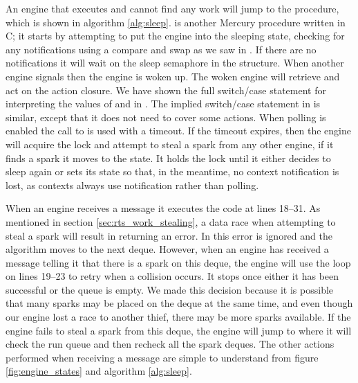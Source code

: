 An engine that executes \idle and cannot find any work will jump to the
\sleep procedure,
which is shown in algorithm \ref{alg:sleep}.
\sleep is another Mercury procedure written in C;
it starts by attempting to put the engine into the sleeping state,
checking for any notifications using a compare and swap as we saw in \idle.
If there are no notifications it will wait on the sleep semaphore in the
\enginesleepsync structure.
When another engine signals  then the engine is woken up.
The woken engine will retrieve and act on the action closure.
We have shown the full switch/case statement for interpreting the values of
 and  in \sleep.
The implied switch/case statement in \idle is similar,
except that it does not need to cover some actions.
When polling is enabled the call to  is used with a
timeout.
If the timeout expires,
then the engine will acquire the lock and attempt to
steal a spark from any other engine, if it finds a spark it moves to the
 state.
It holds the lock until it either decides to sleep again or sets its state
so that, in the meantime, no context notification is lost,
as contexts always use notification rather than polling.

When an engine receives a  message it executes
the code at lines 18--31.
As mentioned in section \ref{sec:rts_work_stealing},
a data race when attempting to steal a spark will result in
\steal returning an error.
In \trystealspark this error is ignored and the algorithm moves to the next
deque.
However,
when an engine has received a message telling it that there is a spark on
this deque, the engine will use the loop on lines 19--23 to retry when a
collision occurs.
It stops once either it has been successful or the queue is empty.
We made this decision because it is possible that many sparks may be placed
on the deque at the same time,
and even though our engine lost a race to another thief, there may be more
sparks available.
If the engine fails to steal a spark from this deque,
the engine will jump to \idle where it will check the run queue and then
recheck all the spark deques.
The other actions performed when receiving a message are simple to
understand from figure \ref{fig:engine_states} and algorithm
\ref{alg:sleep}.

